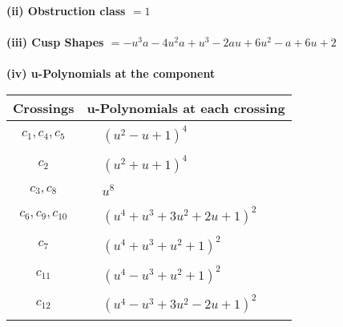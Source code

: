 \documentclass[1p]{elsarticle_modified}
\theoremstyle{definition}
\begin{document}
\flushleft \textbf{(ii) Obstruction class $= 1$}\\~\\
\flushleft \textbf{(iii) Cusp Shapes $= - u^3 a-4 u^2 a+u^3-2 a u+6 u^2- a+6 u+2$}\\~\\
\newpage\renewcommand{\arraystretch}{1}
\flushleft \textbf{(iv) u-Polynomials at the component}\newline \\
\begin{tabular}{m{50pt}|m{274pt}}
Crossings & \hspace{64pt}u-Polynomials at each crossing \\
\hline $$\begin{aligned}c_{1},c_{4},c_{5}\end{aligned}$$&$\begin{aligned}
&(u^2- u+1)^4
\end{aligned}$\\
\hline $$\begin{aligned}c_{2}\end{aligned}$$&$\begin{aligned}
&(u^2+u+1)^4
\end{aligned}$\\
\hline $$\begin{aligned}c_{3},c_{8}\end{aligned}$$&$\begin{aligned}
&u^8
\end{aligned}$\\
\hline $$\begin{aligned}c_{6},c_{9},c_{10}\end{aligned}$$&$\begin{aligned}
&(u^4+u^3+3 u^2+2 u+1)^2
\end{aligned}$\\
\hline $$\begin{aligned}c_{7}\end{aligned}$$&$\begin{aligned}
&(u^4+u^3+u^2+1)^2
\end{aligned}$\\
\hline $$\begin{aligned}c_{11}\end{aligned}$$&$\begin{aligned}
&(u^4- u^3+u^2+1)^2
\end{aligned}$\\
\hline $$\begin{aligned}c_{12}\end{aligned}$$&$\begin{aligned}
&(u^4- u^3+3 u^2-2 u+1)^2
\end{aligned}$\\
\hline
\end{tabular}\\~\\
\end{document}
